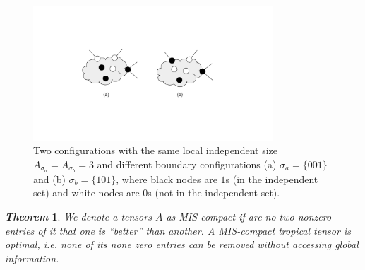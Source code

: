 \documentclass{article}
\newcommand{\<}{\langle}
\renewcommand{\>}{\rangle}
\newtheorem{theorem}{\textit{Theorem}}
\theoremstyle{definition}\newtheorem{definition}{\textit{Definition}}
\begin{document}
\begin{figure}
    \centering
    \includegraphics[width=0.8\textwidth, trim={5cm 4cm 5cm 4cm}, clip]{compressionrule.pdf}
    \caption{Two configurations with the same local independent size $A_{\sigma_a} = A_{\sigma_b} = 3$ and different boundary configurations (a) $\sigma_a=\{001\}$ and (b) $\sigma_b = \{101\}$, where black nodes are $1$s (in the independent set) and white nodes are $0$s (not in the independent set).}\label{fig:compressrule}
\end{figure}

\begin{theorem}
    We denote a tensors $A$ as MIS-compact if are no two nonzero entries of it that one is ``better'' than another.
    A MIS-compact tropical tensor is optimal, i.e. none of its none zero entries can be removed without accessing global information.
\end{theorem}
\end{document}
